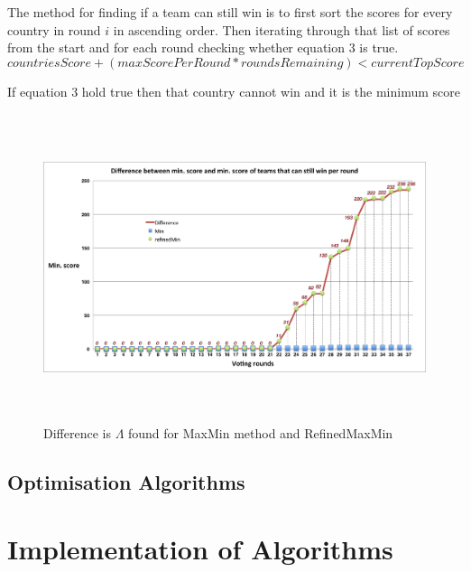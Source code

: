 \documentclass[12pt]{report}
\begin{document}
The method for finding if a team can still win is to first sort the scores for every country in round $i$ in ascending order. Then iterating through that list of scores from the start and for each round checking whether equation 3 is true.
\begin{equation}
	countriesScore + (maxScorePerRound * roundsRemaining) < currentTopScore
\end{equation}

If equation 3 hold true then that country cannot win and it is the minimum score


\begin{figure}[H]
\centering
\includegraphics[width=17cm, height=9cm]{../code/misc/difference_MinvsRefinedMin}
\caption{Difference is $\Lambda$ found for MaxMin method and RefinedMaxMin}
\label{f_maxminDif}
\end{figure}

\subsection{Optimisation Algorithms}\label{Algorithms}


\section{Implementation of Algorithms}\label{Implementation}
\end{document}
